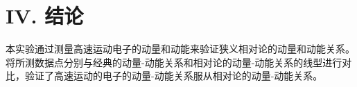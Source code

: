 \documentclass[aps,prl,preprint,groupedaddress]{revtex4-2}
\begin{document}
\section{IV. 结论}

本实验通过测量高速运动电子的动量和动能来验证狭义相对论的动量和动能关系。将所测数据点分别与经典的动量-动能关系和相对论的动量-动能关系的线型进行对比，验证了高速运动的电子的动量-动能关系服从相对论的动量-动能关系。


%



%
\end{document}

